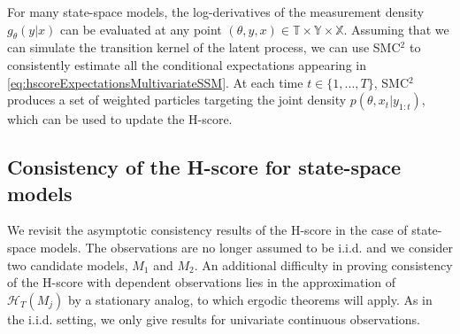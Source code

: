 \documentclass[12pt]{article}
\theoremstyle{plain}
\theoremstyle{definition}
\begin{document}
	For many state-space models, the log-derivatives of the measurement density $g_\theta(y|x)$ can be evaluated at any point
	$(\theta,y,x)\in\mathbb{T}\times\mathbb{Y}\times\mathbb{X}$. Assuming that we can simulate 
	the transition kernel of the latent process, we
	can use SMC$^2$ \citep{fulop2013efficient,chopin:jacob:papaspiliopoulos2013} to
	consistently estimate all the conditional expectations appearing in 
	\eqref{eq:hscoreExpectationsMultivariateSSM}. At each time $t\in\{1,...,T\}$,
	SMC$^2$
	produces a set of weighted particles targeting the joint density $p(\theta,x_t|y_{1:t})$, which can be used
	to update the H-score.
	\subsection{Consistency of the H-score for state-space models}
	\label{sec:consistencySSM}
	We revisit the asymptotic consistency results of the H-score in the case of state-space models.
	The observations are no longer assumed to be i.i.d.\! and we
	consider two candidate models, $M_1$ and $M_2$. An additional difficulty in proving 
	consistency of the H-score with dependent observations lies in the approximation of $\mathcal{H}_{T}(M_j)$ by a stationary analog, to which ergodic theorems will apply. As in the i.i.d.\! setting, we
	only give results for univariate continuous observations.  
	
\end{document}
